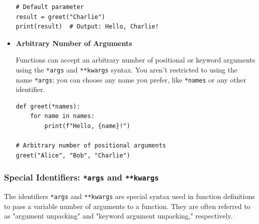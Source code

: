 \begin{itemize}
\begin{codebox}
\begin{verbatim}
# Default parameter
result = greet("Charlie")
print(result)  # Output: Hello, Charlie!
\end{verbatim}
\end{codebox}
    
    \item \textbf{Arbitrary Number of Arguments}
    
    Functions can accept an arbitrary number of positional or keyword arguments using the \texttt{*args} and \texttt{**kwargs} syntax. You aren't restricted to using the name \texttt{*args}; you can choose any name you prefer, like \texttt{*names} or any other identifier. 
\begin{codebox}
\begin{verbatim}
def greet(*names):
    for name in names:
        print(f"Hello, {name}!")

# Arbitrary number of positional arguments
greet("Alice", "Bob", "Charlie") 
\end{verbatim}
\end{codebox}
\end{itemize}

\newpage
\subsubsection{Special Identifiers: \texttt{*args} and \texttt{**kwargs}}
The identifiers \texttt{*args} and \texttt{**kwargs} are special syntax used in function definitions to pass a variable number of arguments to a function. They are often referred to as "argument unpacking" and "keyword argument unpacking," respectively.\vspace{12pt}

